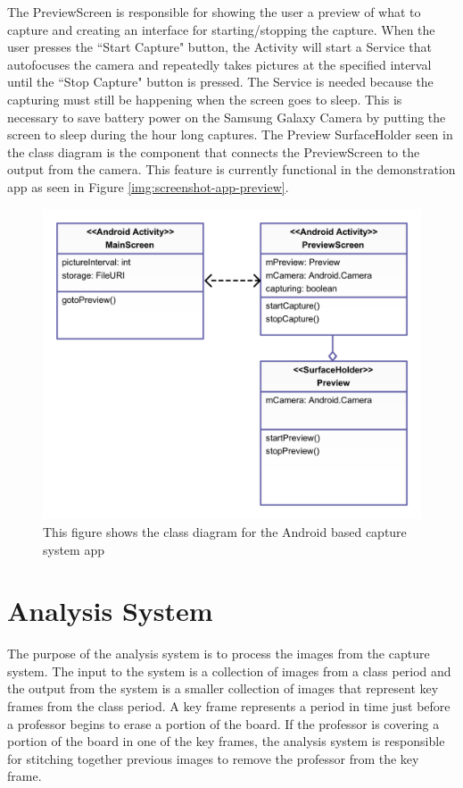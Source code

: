 \documentclass[]{article}
\begin{document}
					The PreviewScreen is responsible for showing the user a preview of what to capture and creating an interface for starting/stopping the capture. When the user presses the ``Start Capture" button, the Activity will start a Service that autofocuses the camera and repeatedly takes pictures at the specified interval until the ``Stop Capture" button is pressed. The Service is needed because the capturing must still be happening when the screen goes to sleep. This is necessary to save battery power on the Samsung Galaxy Camera by putting the screen to sleep during the hour long captures. The Preview SurfaceHolder seen in the class diagram is the component that connects the PreviewScreen to the output from the camera. This feature is currently functional in the demonstration app as seen in Figure \ref{img:screenshot-app-preview}. 
					
					\begin{figure}
						\centering
						\includegraphics[scale=0.3]{images/uml-capture-system.pdf}
						\caption{This figure shows the class diagram for the Android based capture system app}
						\label{img:uml-capture-system}
					\end{figure}
	
	
	\section{Analysis System}
		The purpose of the analysis system is to process the images from the capture system. The input to the system is a collection of images from a class period and the output from the system is a smaller collection of images that represent key frames from the class period. A key frame represents a period in time just before a professor begins to erase a portion of the board. If the professor is covering a portion of the board in one of the key frames, the analysis system is responsible for stitching together previous images to remove the professor from the key frame.  
		
\end{document}
